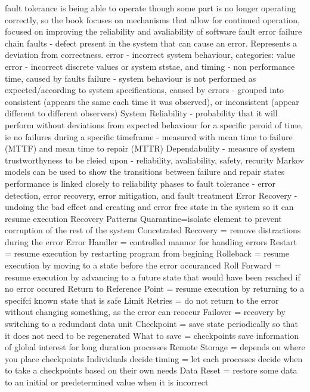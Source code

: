 \cite{hanmer2013patterns}
fault tolerance is being able to operate though some part is no longer operating correctly, so the book focuses on mechanisms that allow for continued operation, focused on improving the reliability and avaliability of software 
fault error failure chain
faults - defect present in the system that can cause an error. Represents a deviation from correctness. 
error - incorrect system behaviour, categories: value error - incorrect discrete values or system ststae, and timing - non performance time, caused by faults
failure - system behaviour is not performed as expected/according to system specifications, caused by errors
- grouped into consistent (appears the same each time it was observed), or inconsistent (appear different to different observers)
System Reliability - probability that it will perform without deviations from expected behaviour for a specific peroid of time, ie no failures during a specific timeframe
- measured with mean time to failure (MTTF) and mean time to repair (MTTR)
Dependabulity - measure of system trustworthyness to be rleied upon - reliability, avaliability, safety, recurity
Markov models can be used to show the transitions between failure and repair states
performance is linked closely to reliability
phases to fault tolerance - error detection, error recovery, error mitigation, and fault treatment
Error Recovery - undoing the bad effect and creating and error free state in the system so it can resume execution
Recovery Patterns
Quarantine=isolate element to prevent corruption of the rest of the system
Concetrated Recovery = remove distractions during the error
Error Handler = controlled mannor for handling errors
Restart = resume execution by restarting program from begining 
Rolleback = resume execution by moving to a state before the error occuranced
Roll Forward = resume execution by advancing to a future state that would have been reached if no error occured
Return to Reference Point = resume execution by returning to a specifci known state that is safe
Limit Retries = do not return to the error without changing something, as the error can reoccur
Failover = recovery by switching to a redundant data unit
Checkpoint = save state periodically so that it does not need to be regenerated
What to save = checkpoints save information of global interest for long duration processes
Remote Storage = depends on where you place checkpoints
Individuals decide timing = let each processes decide when to take a checkpoints based on their own needs
Data Reset = restore some data to an initial or predetermined value when it is incorrect


